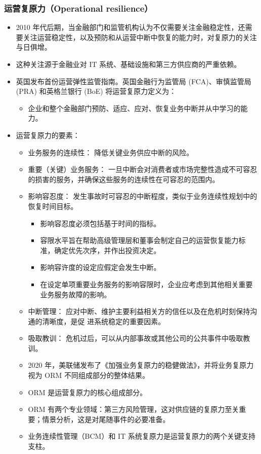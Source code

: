 \subsubsection{运营复原力（Operational resilience）}
\begin{itemize}
\item 2010 年代后期，当金融部门和监管机构认为不仅需要关注金融稳定性，还需要关注运营稳定性，以及预防和从运营中断中恢复的能力时，对复原力的关注与日俱增。
\item 这种关注源于金融业对 IT 系统、基础设施和第三方供应商的严重依赖。
\item 英国发布首份运营弹性监管指南。英国金融行为监管局 (FCA)、审慎监管局 (PRA) 和英格兰银行 (BoE) 将运营复原力定义为：
    \begin{itemize}
    \item 企业和整个金融部门预防、适应、应对、恢复业务中断并从中学习的能力。
    \end{itemize}
\item 运营复原力的要素：
    \begin{itemize}
    \item 业务服务的连续性： 降低关键业务供应中断的风险。
    \item  重要（关键）业务服务： 一旦中断会对消费者或市场完整性造成不可容忍的损害的服务，并确保这些服务的连续性在可容忍的范围内。
    \item 影响容忍度： 发生事故时可容忍的中断程度，类似于业务连续性规划中的恢复时间目标。
        \begin{itemize}
        \item 影响容忍度必须包括基于时间的指标。
        \item 容限水平旨在帮助高级管理层和董事会制定自己的运营恢复能力标准，确定优先次序，并作出投资决定。
        \item 影响容许度的设定应假定会发生中断。
        \item 在设定单项重要业务服务的影响容限时，企业应考虑到其他相关重要业务服务故障的影响。
        \end{itemize}
    \item 中断管理： 应对中断、维护主要利益相关方的信任以及在危机时刻保持沟通的清晰度，是促 进系统稳定的重要因素。
    \item 吸取教训： 危机过后，可以从内部事故或其他公司的公共事件中吸取教训。
    \item 2020 年，美联储发布了《加强业务复原力的稳健做法》，并将业务复原力视为 ORM 不同组成部分的整体结果。
    \item ORM 是运营复原力的核心组成部分。
    \item ORM 有两个专业领域：第三方风险管理，这对供应链的复原力至关重要；情景分析，这是对尾随事件的必要准备。
    \item 业务连续性管理（BCM）和 IT 系统复原力是运营复原力的两个关键支持支柱。
    \end{itemize}
\end{itemize}




